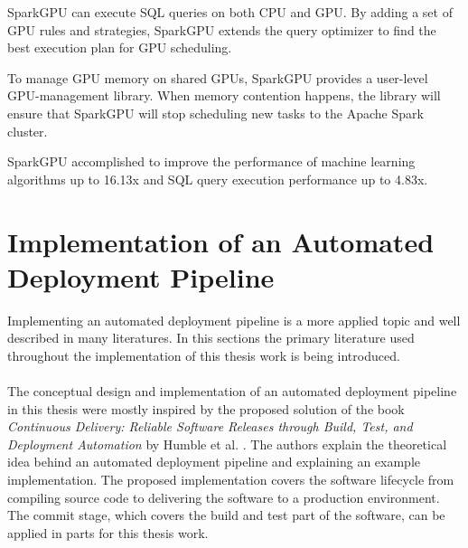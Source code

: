 SparkGPU can execute SQL queries on both CPU and GPU.
By adding a set of GPU rules and strategies, SparkGPU extends the query optimizer to find the best execution plan for GPU scheduling.

To manage GPU memory on shared GPUs, SparkGPU provides a user-level GPU-management library.
When memory contention happens, the library will ensure that SparkGPU will stop scheduling new tasks to the Apache Spark cluster.

SparkGPU accomplished to improve the performance of machine learning algorithms up to 16.13x and SQL query execution performance up to 4.83x.


\section{Implementation of an Automated Deployment Pipeline}
Implementing an automated deployment pipeline is a more applied topic and well described in many literatures. In this sections the primary literature used throughout the implementation of this thesis work is being introduced.


\paragraph{}The conceptual design and implementation of an automated deployment pipeline in this thesis were mostly inspired by the proposed solution of the book \textit{Continuous Delivery: Reliable Software Releases through Build, Test, and Deployment Automation} by Humble et al. \cite{Farley2010CI}.
The authors explain the theoretical idea behind an automated deployment pipeline and explaining an example implementation.
The proposed implementation covers the software lifecycle from compiling source code to delivering the software to a production environment.
The commit stage, which covers the build and test part of the software, can be applied in parts for this thesis work.

